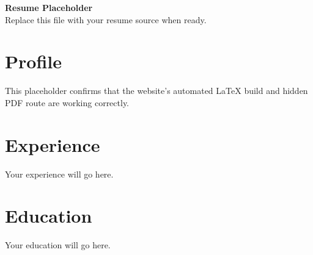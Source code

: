 \documentclass[11pt,a4paper]{article}
\begin{document}
\begin{center}
  {\LARGE\textbf{Resume Placeholder}}\\[0.75em]
  Replace this file with your resume source when ready.
\end{center}

\section*{Profile}
This placeholder confirms that the website's automated LaTeX build and hidden
PDF route are working correctly.

\section*{Experience}
Your experience will go here.

\section*{Education}
Your education will go here.
\end{document}
